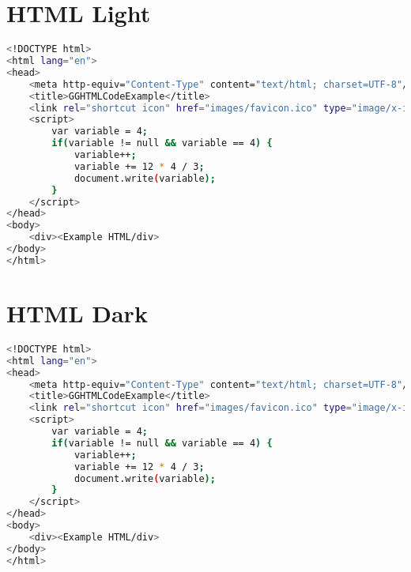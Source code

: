 \section{HTML Light}

\begin{lstlisting}[language=bash, style=customStyleHTMLLight, caption=Snippet title]
<!DOCTYPE html>
<html lang="en">
<head>
    <meta http-equiv="Content-Type" content="text/html; charset=UTF-8"/>
    <title>GGHTMLCodeExample</title>
    <link rel="shortcut icon" href="images/favicon.ico" type="image/x-icon">
    <script>
    	var variable = 4;
    	if(variable != null && variable == 4) {		
    		variable++;
    		variable += 12 * 4 / 3;
    		document.write(variable);
    	}
    </script>
</head>
<body>
    <div><Example HTML/div>
</body>
</html>
\end{lstlisting}

\section{HTML Dark}

\begin{lstlisting}[language=bash, style=customStyleHTMLDark, caption=Snippet title]
<!DOCTYPE html>
<html lang="en">
<head>
    <meta http-equiv="Content-Type" content="text/html; charset=UTF-8"/>
    <title>GGHTMLCodeExample</title>
    <link rel="shortcut icon" href="images/favicon.ico" type="image/x-icon">
    <script>
    	var variable = 4;
    	if(variable != null && variable == 4) {		
    		variable++;
    		variable += 12 * 4 / 3;
    		document.write(variable);
    	}
    </script>
</head>
<body>
    <div><Example HTML/div>
</body>
</html>
\end{lstlisting}